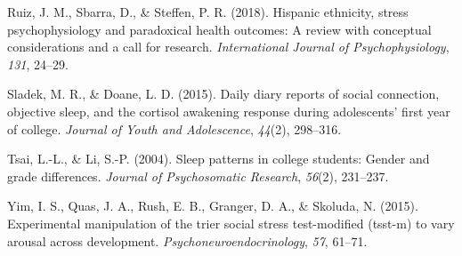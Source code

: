 \documentclass[
  man, fleqn, noextraspace]{apa6}
\begin{document}
\leavevmode\hypertarget{ref-ruiz2018hispanic}{}%
Ruiz, J. M., Sbarra, D., \& Steffen, P. R. (2018). Hispanic ethnicity, stress psychophysiology and paradoxical health outcomes: A review with conceptual considerations and a call for research. \emph{International Journal of Psychophysiology}, \emph{131}, 24--29.

\leavevmode\hypertarget{ref-sladek2015daily}{}%
Sladek, M. R., \& Doane, L. D. (2015). Daily diary reports of social connection, objective sleep, and the cortisol awakening response during adolescents' first year of college. \emph{Journal of Youth and Adolescence}, \emph{44}(2), 298--316.

\leavevmode\hypertarget{ref-tsai2004sleep}{}%
Tsai, L.-L., \& Li, S.-P. (2004). Sleep patterns in college students: Gender and grade differences. \emph{Journal of Psychosomatic Research}, \emph{56}(2), 231--237.

\leavevmode\hypertarget{ref-yim2015experimental}{}%
Yim, I. S., Quas, J. A., Rush, E. B., Granger, D. A., \& Skoluda, N. (2015). Experimental manipulation of the trier social stress test-modified (tsst-m) to vary arousal across development. \emph{Psychoneuroendocrinology}, \emph{57}, 61--71.

\endgroup
\end{document}
